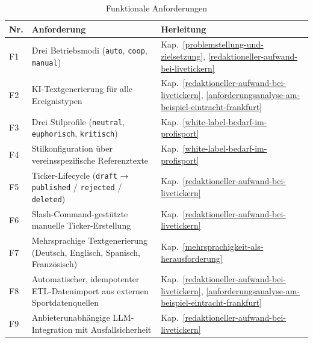 \begin{longtable}[]{@{}
  >{\raggedright\arraybackslash}p{}
  >{\raggedright\arraybackslash}p{}
  >{\raggedright\arraybackslash}p{}@{}}
\caption{Funktionale Anforderungen}\label{tab:funktionale-anforderungen}\\
\toprule\noalign{}
\begin{minipage}[b]{\linewidth}\raggedright
Nr.
\end{minipage} & \begin{minipage}[b]{\linewidth}\raggedright
Anforderung
\end{minipage} & \begin{minipage}[b]{\linewidth}\raggedright
Herleitung
\end{minipage} \\
\midrule\noalign{}
\endhead
\bottomrule\noalign{}
\endlastfoot
F1 & Drei Betriebsmodi (\texttt{auto}, \texttt{coop}, \texttt{manual}) & Kap.~\ref{problemstellung-und-zielsetzung}, \ref{redaktioneller-aufwand-bei-livetickern} \\
F2 & KI-Textgenerierung für alle Ereignistypen & Kap.~\ref{redaktioneller-aufwand-bei-livetickern}, \ref{anforderungsanalyse-am-beispiel-eintracht-frankfurt} \\
F3 & Drei Stilprofile (\texttt{neutral}, \texttt{euphorisch}, \texttt{kritisch}) & Kap.~\ref{white-label-bedarf-im-profisport} \\
F4 & Stilkonfiguration über vereinsspezifische Referenztexte & Kap.~\ref{white-label-bedarf-im-profisport} \\
F5 & Ticker-Lifecycle (\texttt{draft} → \texttt{published} / \texttt{rejected} / \texttt{deleted}) & Kap.~\ref{redaktioneller-aufwand-bei-livetickern} \\
F6 & Slash-Command-gestützte manuelle Ticker-Erstellung & Kap.~\ref{redaktioneller-aufwand-bei-livetickern} \\
F7 & Mehrsprachige Textgenerierung (Deutsch, Englisch, Spanisch, Französisch) & Kap.~\ref{mehrsprachigkeit-als-herausforderung} \\
F8 & Automatischer, idempotenter ETL-Datenimport aus externen Sportdatenquellen & Kap.~\ref{redaktioneller-aufwand-bei-livetickern}, \ref{anforderungsanalyse-am-beispiel-eintracht-frankfurt} \\
F9 & Anbieterunabhängige LLM-Integration mit Ausfallsicherheit & Kap.~\ref{redaktioneller-aufwand-bei-livetickern} \\

\end{longtable}
